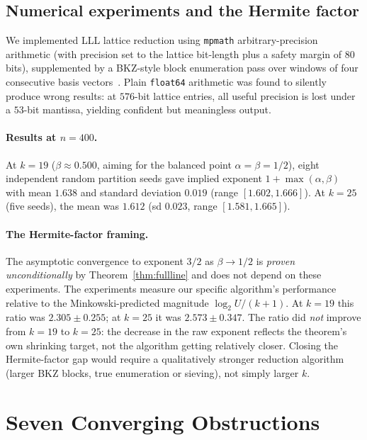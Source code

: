 \documentclass[12pt]{article}
\theoremstyle{remark}
\begin{document}
\subsection{Numerical experiments and the Hermite factor}
\label{sec:hermite}

We implemented LLL lattice reduction using \texttt{mpmath} arbitrary-precision
arithmetic (with precision set to the lattice bit-length plus a safety margin of
$80$ bits), supplemented by a BKZ-style block enumeration pass over windows of
four consecutive basis vectors~\cite{schnorr1994}.  Plain \texttt{float64}
arithmetic was found to silently produce wrong results: at $576$-bit lattice
entries, all useful precision is lost under a $53$-bit mantissa, yielding
confident but meaningless output.

\paragraph{Results at $n = 400$.}  At $k = 19$ ($\beta \approx 0.500$, aiming
for the balanced point $\alpha = \beta = 1/2$), eight independent random
partition seeds gave implied exponent $1 + \max(\alpha,\beta)$ with mean $1.638$
and standard deviation $0.019$ (range $[1.602, 1.666]$).  At $k = 25$ (five
seeds), the mean was $1.612$ (sd $0.023$, range $[1.581, 1.665]$).

\paragraph{The Hermite-factor framing.}
The asymptotic convergence to exponent $3/2$ as $\beta \to 1/2$ is
\emph{proven unconditionally} by Theorem~\ref{thm:fullline} and does not depend
on these experiments.  The experiments measure our specific algorithm's
performance relative to the Minkowski-predicted magnitude $\log_2 U / (k+1)$.
At $k = 19$ this ratio was $2.305 \pm 0.255$; at $k = 25$ it was $2.573 \pm
0.347$.  The ratio did \emph{not} improve from $k = 19$ to $k = 25$: the
decrease in the raw exponent reflects the theorem's own shrinking target, not
the algorithm getting relatively closer.  Closing the Hermite-factor gap would
require a qualitatively stronger reduction algorithm (larger BKZ blocks, true
enumeration or sieving), not simply larger $k$.

\section{Seven Converging Obstructions}
\end{document}
